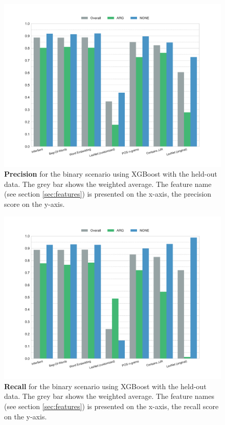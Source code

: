\begin{figure}[htbp]
         \caption{\textbf{Precision} for the binary scenario using XGBoost with the held-out data. The grey bar shows the weighted average. The feature name (see section \ref{sec:features}) is presented on the x-axis, the precision score on the y-axis.} 
    \label{fig:h_2_prec}
    \centering
	\includegraphics[width=0.9\linewidth]{images/heldout/h-precision-True}
    \end{figure}
    
    \begin{figure}[htbp]
              \caption{\textbf{Recall} for the binary scenario using XGBoost with the held-out data. The grey bar shows the weighted average. The feature names (see section \ref{sec:features}) is presented on the x-axis, the recall score on the y-axis.} 
       \label{fig:h_2_rec}
 \centering
	\includegraphics[width=0.9\linewidth]{images/heldout/h-recall-True}

\end{figure}
\FloatBarrier
